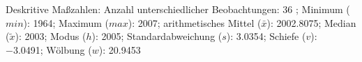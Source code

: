 				\label{tableValues:adem03}
				\vspace*{-\baselineskip}
                    \begin{noten}
                	    \note{} Deskritive Maßzahlen:
                	    Anzahl unterschiedlicher Beobachtungen: 36%
                	    ; 
                	      Minimum ($min$): 1964; 
                	      Maximum ($max$): 2007; 
                	      arithmetisches Mittel ($\bar{x}$): \num[round-mode=places,round-precision=2]{2002,8075}; 
                	      Median ($\tilde{x}$): 2003; 
                	      Modus ($h$): 2005; 
                	      Standardabweichung ($s$): \num[round-mode=places,round-precision=2]{3,0354}; 
                	      Schiefe ($v$): \num[round-mode=places,round-precision=2]{-3,0491}; 
                	      Wölbung ($w$): \num[round-mode=places,round-precision=2]{20,9453}
                     \end{noten}


